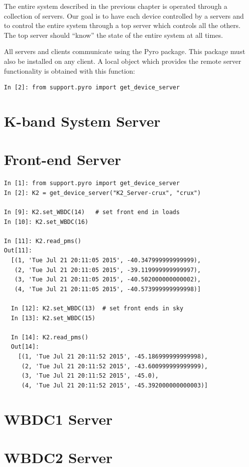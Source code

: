\documentclass[letterpaper,11pt]{book}
\begin{document}
The entire system described in the previous chapter is operated through a
collection of servers. Our goal is to have each device controlled by a servers
and to control the entire system through a top server which controls all the
others.  The top server should ``know'' the state of the entire system at all
times.

All servers and clients communicate using the Pyro package.  This package must
also be installed on any client.  A local object which provides the remote
server functionality is obtained with this function:
\begin{verbatim}
In [2]: from support.pyro import get_device_server
\end{verbatim}

\section{K-band System Server}

\section{Front-end Server}

\begin{verbatim}
In [1]: from support.pyro import get_device_server
In [2]: K2 = get_device_server("K2_Server-crux", "crux")

In [9]: K2.set_WBDC(14)   # set front end in loads
In [10]: K2.set_WBDC(16)

In [11]: K2.read_pms()
Out[11]:
  [(1, 'Tue Jul 21 20:11:05 2015', -40.347999999999999),
   (2, 'Tue Jul 21 20:11:05 2015', -39.119999999999997),
   (3, 'Tue Jul 21 20:11:05 2015', -40.502000000000002),
   (4, 'Tue Jul 21 20:11:05 2015', -40.573999999999998)]
  
  In [12]: K2.set_WBDC(13)  # set front ends in sky
  In [13]: K2.set_WBDC(15)
  
  In [14]: K2.read_pms()
  Out[14]:
    [(1, 'Tue Jul 21 20:11:52 2015', -45.186999999999998),
     (2, 'Tue Jul 21 20:11:52 2015', -43.600999999999999),
     (3, 'Tue Jul 21 20:11:52 2015', -45.0),
     (4, 'Tue Jul 21 20:11:52 2015', -45.392000000000003)] 
\end{verbatim}


\section{WBDC1 Server}

\section{WBDC2 Server}
\end{document}
